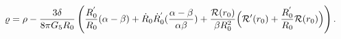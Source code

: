 \begin{equation}
\varrho=\rho-\frac{3\delta}{8\pi
G_{5}R_{0}}\left(\frac{R^{'}_{0}}{R_{0}}
(\alpha-\beta)+\dot{R}_{0}\dot{R}^{'}_{0}(\frac{\alpha-\beta}{\alpha\beta})
+\frac{{\cal R}(r_{0})}{\beta R_{0}^2}\Bigl({\cal R'}
(r_{0})+\frac{R^{'}_{0}}{R_{0}}{\cal R}(r_{0})\Bigr)\right).
\end{equation}

